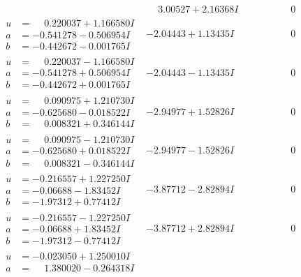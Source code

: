 \documentclass[1p]{elsarticle_modified}
\theoremstyle{definition}
\begin{document}
$$\begin{array}{c|c|c}
 & \phantom{-}3.00527 + 2.16368 I & \phantom{-0.000000 } 0 \\ \hline\begin{aligned}
u &= \phantom{-}0.220037 + 1.166580 I \\
a &= -0.541278 - 0.506954 I \\
b &= -0.442672 - 0.001765 I\end{aligned}
 & -2.04443 + 1.13435 I & \phantom{-0.000000 } 0 \\ \hline\begin{aligned}
u &= \phantom{-}0.220037 - 1.166580 I \\
a &= -0.541278 + 0.506954 I \\
b &= -0.442672 + 0.001765 I\end{aligned}
 & -2.04443 - 1.13435 I & \phantom{-0.000000 } 0 \\ \hline\begin{aligned}
u &= \phantom{-}0.090975 + 1.210730 I \\
a &= -0.625680 - 0.018522 I \\
b &= \phantom{-}0.008321 + 0.346144 I\end{aligned}
 & -2.94977 + 1.52826 I & \phantom{-0.000000 } 0 \\ \hline\begin{aligned}
u &= \phantom{-}0.090975 - 1.210730 I \\
a &= -0.625680 + 0.018522 I \\
b &= \phantom{-}0.008321 - 0.346144 I\end{aligned}
 & -2.94977 - 1.52826 I & \phantom{-0.000000 } 0 \\ \hline\begin{aligned}
u &= -0.216557 + 1.227250 I \\
a &= -0.06688 - 1.83452 I \\
b &= -1.97312 + 0.77412 I\end{aligned}
 & -3.87712 - 2.82894 I & \phantom{-0.000000 } 0 \\ \hline\begin{aligned}
u &= -0.216557 - 1.227250 I \\
a &= -0.06688 + 1.83452 I \\
b &= -1.97312 - 0.77412 I\end{aligned}
 & -3.87712 + 2.82894 I & \phantom{-0.000000 } 0 \\ \hline\begin{aligned}
u &= -0.023050 + 1.250010 I \\
a &= \phantom{-}1.380020 - 0.264318 I \\

\end{aligned}
\end{array}$$
\end{document}
